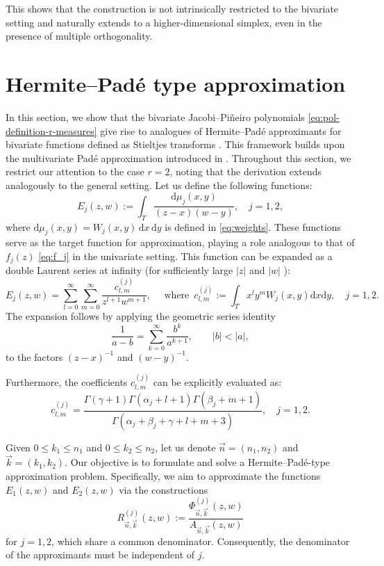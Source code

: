 \documentclass[11pt,reqno]{amsart}
\theoremstyle{definition}
\begin{document}
This shows that the construction is not intrinsically restricted to the bivariate setting and naturally extends to a higher-dimensional simplex, even in the presence of multiple orthogonality.



\section{Hermite--Pad\'e type approximation}\label{sec:HP}

In this section, we show that the bivariate Jacobi--Pi\~neiro polynomials \eqref{eq:pol-definition-r-measures} give rise to analogues of Hermite--Pad\'e approximants for bivariate functions defined as Stieltjes transforms \citep{AFPP08}. This framework builds upon the multivariate Pad\'e approximation introduced in \citep{Sor02}. Throughout this section, we restrict our attention to the case $r=2$, noting that the derivation extends analogously to the general setting. Let us define the following functions:
\begin{equation}
\label{eq:Ej-integral}
    E_j(z,w):= \int_T \frac{\mathrm d\mu_j(x,y)}{(z - x)(w - y)}, \quad j=1,2,
\end{equation}
where $\mathrm d \mu_j(x,y)=W_j(x,y)\,\mathrm{d} x\,\mathrm{d} y$ is defined in \eqref{eq:weights}. These functions serve as the target function for approximation, playing a role analogous to that of $f_j(z)$ \eqref{eq:f_j} in the univariate setting. This function can be expanded as a double Laurent series at infinity (for sufficiently large $|z|$ and $|w|$ ):
\begin{equation}
    \label{eq:Ej-series}
    E_j(z,w)= \sum_{l=0}^\infty \sum_{m=0}^\infty \frac{c_{l,m}^{(j)}}{z^{l+1} w^{m+1}}, \quad\text{ where } \, c_{l,m}^{(j)} := \int_T x^l y^m W_j(x,y) \mathrm{d} x \mathrm{d} y, \quad j=1,2.
\end{equation}
The expansion follows by applying the geometric series identity 
$$\dfrac{1}{a-b}=\sum_{k=0}^\infty\dfrac{b^k}{a^{k+1}}, \qquad |b|<|a|,
$$
to the factors $(z-x)^{-1}$ and $(w-y)^{-1}$.

Furthermore, the coefficients $c_{l,m}^{(j)}$ can be explicitly evaluated as:
\begin{equation*}
    c_{l,m}^{(j)}=\frac{\Gamma (\gamma +1) \Gamma (\alpha_j+l+1) \Gamma (\beta_j+m+1)}{\Gamma (\alpha_j+\beta_j+\gamma+l+m +3)}, \quad j=1,2.
\end{equation*}


Given $0\leq k_1\leq n_1$ and $0\leq k_2\leq n_2$, let us denote $\vec n=(n_1,n_2)$ and $\vec k = (k_1,k_2)$. Our objective is to formulate and solve a Hermite--Pad\'e-type approximation problem. Specifically, we aim to approximate the functions $E_1(z,w)$ and $E_2(z,w)$ via the constructions 
\begin{equation}
    \label{eq:R-approx-def}
    R_{\vec n,\vec k}^{(j)}(z,w) := \dfrac{\Phi_{\vec n,\vec k}^{(j)}(z,w)}{A_{\vec n,\vec k}(z,w)}
\end{equation}
for $j=1,2$, which share a common denominator. Consequently, the denominator of the approximants must be independent of $j$. 
\end{document}
